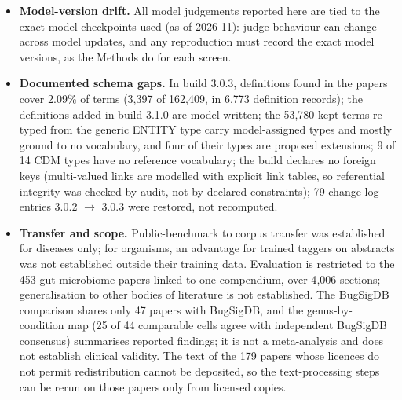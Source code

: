\documentclass[referee,lineno,pdflatex,sn-vancouver-num]{sn-jnl}
\theoremstyle{thmstyleone}%
\theoremstyle{thmstyletwo}%
\theoremstyle{thmstylethree}%
\begin{document}
\begin{itemize}
sanity-checked to the same depth for every judge; concordance with
model judges is not concordance with experts. The judges' majority rejects
68.9\% of stated DNA extraction methods, 56.3\% of sequencing platforms,
40.4\% of body sites and 40.2\% of intervention agents, so these catalogue
fields should be treated as low confidence. Each model step was run once
at temperature 0, and run-to-run variance was not measured.
\item \textbf{Model-version drift.} All model judgements reported here
are tied to the exact model checkpoints used (as of 2026-11): judge
behaviour can change across model updates, and any reproduction must
record the exact model versions, as the Methods do for each screen.
\item \textbf{Documented schema gaps.} In build 3.0.3, definitions found in
the papers cover 2.09\% of terms (3{,}397 of 162{,}409, in 6{,}773 definition
records); the definitions added in build 3.1.0 are model-written; the 53{,}780 kept terms re-typed from the
generic ENTITY type carry model-assigned types and mostly ground to no
vocabulary, and four of their types are proposed extensions; 9 of
14 CDM types have no reference vocabulary; the build declares no
foreign keys (multi-valued links are modelled with explicit link
tables, so referential integrity was checked by audit, not by
declared constraints); 79 change-log entries 3.0.2 $\to$ 3.0.3 were
restored, not recomputed.
\item \textbf{Transfer and scope.} Public-benchmark to corpus
transfer was established for diseases only; for organisms, an
advantage for trained taggers on abstracts was not established
outside their training data. Evaluation is restricted to the 453
gut-microbiome papers linked to one compendium, over 4{,}006
sections; generalisation to other bodies of literature is not
established. The BugSigDB comparison shares only 47 papers with
BugSigDB, and the genus-by-condition map (25 of 44 comparable cells
agree with independent BugSigDB consensus) summarises reported findings;
it is not a meta-analysis and does not establish clinical validity. The
text of the 179 papers whose licences do not permit redistribution cannot
be deposited, so the text-processing steps can be rerun on those papers
only from licensed copies.
\end{itemize}
\end{document}
